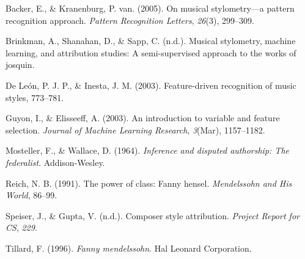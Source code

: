 \documentclass[12pt,twoside]{reedthesis}
\theoremstyle{definition}
\theoremstyle{definition}
\theoremstyle{definition}
\theoremstyle{remark}
\begin{document}

\noindent

\setlength{\parindent}{-0.20in} \setlength{\leftskip}{0.20in}
\setlength{\parskip}{8pt}

\hypertarget{refs}{}
\hypertarget{ref-backer2005}{}
Backer, E., \& Kranenburg, P. van. (2005). On musical stylometry---a
pattern recognition approach. \emph{Pattern Recognition Letters},
\emph{26}(3), 299--309.

\hypertarget{ref-brinkman2016}{}
Brinkman, A., Shanahan, D., \& Sapp, C. (n.d.). Musical stylometry,
machine learning, and attribution studies: A semi-supervised approach to
the works of josquin.

\hypertarget{ref-de2003feature}{}
De León, P. J. P., \& Inesta, J. M. (2003). Feature-driven recognition
of music styles, 773--781.

\hypertarget{ref-guyon2003}{}
Guyon, I., \& Elisseeff, A. (2003). An introduction to variable and
feature selection. \emph{Journal of Machine Learning Research},
\emph{3}(Mar), 1157--1182.

\hypertarget{ref-mosteller1964inference}{}
Mosteller, F., \& Wallace, D. (1964). \emph{Inference and disputed
authorship: The federalist}. Addison-Wesley.

\hypertarget{ref-reich1991}{}
Reich, N. B. (1991). The power of class: Fanny hensel. \emph{Mendelssohn
and His World}, 86--99.

\hypertarget{ref-CompStyleAttri}{}
Speiser, J., \& Gupta, V. (n.d.). Composer style attribution.
\emph{Project Report for CS}, \emph{229}.

\hypertarget{ref-tillard1996}{}
Tillard, F. (1996). \emph{Fanny mendelssohn}. Hal Leonard Corporation.


\end{document}
